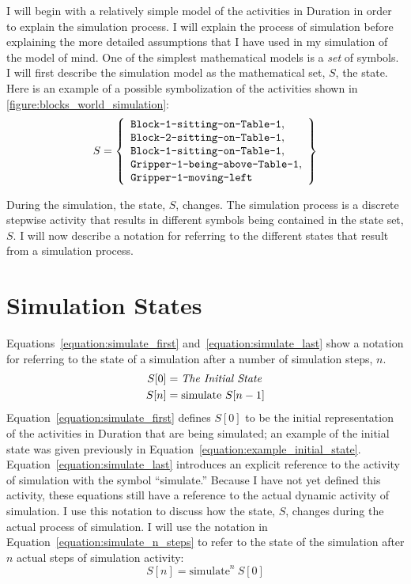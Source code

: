 I will begin with a relatively simple model of the activities in
Duration in order to explain the simulation process.  I will explain
the process of simulation before explaining the more detailed
assumptions that I have used in my simulation of the model of mind.
One of the simplest mathematical models is a \emph{set} of symbols.  I
will first describe the simulation model as the mathematical set, $S$,
the state.  Here is an example of a possible symbolization of the
activities shown in \autoref{figure:blocks_world_simulation}:
\begin{equation}
\label{equation:example_initial_state}
S = \left\{
      \begin{array}{l}
        \text{{\tt Block-1-sitting-on-Table-1}}, \\
        \text{{\tt Block-2-sitting-on-Table-1}}, \\
        \text{{\tt Block-1-sitting-on-Table-1}}, \\
        \text{{\tt Gripper-1-being-above-Table-1}}, \\
        \text{{\tt Gripper-1-moving-left}}
      \end{array}
    \right\}
\end{equation}

During the simulation, the state, $S$, changes.  The simulation
process is a discrete stepwise activity that results in different
symbols being contained in the state set, $S$.  I will now describe a
notation for referring to the different states that result from a
simulation process.

\section{Simulation States}

Equations~\ref{equation:simulate_first}
and~\ref{equation:simulate_last} show a notation for referring to the
state of a simulation after a number of simulation steps, $n$.
\begin{align}
\label{equation:simulate_first}
S[0] &= \text{\emph{The Initial State}} \\
\label{equation:simulate_last}
S[n] &= \text{simulate}~S[n-1]
\end{align}
Equation~\ref{equation:simulate_first} defines $S[0]$ to be the
initial representation of the activities in Duration that are being
simulated; an example of the initial state was given previously in
Equation~\ref{equation:example_initial_state}.
Equation~\ref{equation:simulate_last} introduces an explicit reference
to the activity of simulation with the symbol ``simulate.''  Because I
have not yet defined this activity, these equations still have a
reference to the actual dynamic activity of simulation.  I use this
notation to discuss how the state, $S$, changes during the actual
process of simulation.  I will use the notation in
Equation~\ref{equation:simulate_n_steps} to refer to the state of the
simulation after $n$ actual steps of simulation activity:
\begin{equation}
\label{equation:simulate_n_steps}
S[n] = \text{simulate}^n~S[0]
\end{equation}

